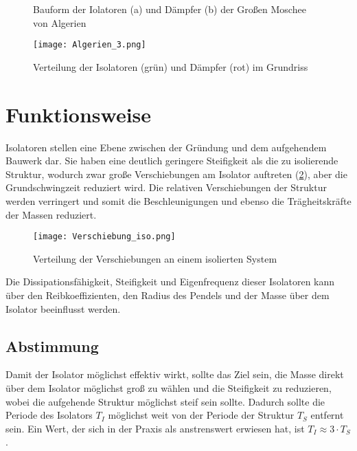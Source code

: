 \begin{figure}[H]
    \centering
    \qquad
    \caption{Bauform der Iolatoren (a) und Dämpfer (b) der Großen Moschee von Algerien \cite{AKK}}%
\end{figure}

\begin{figure}[H]
    \centering
    \texttt{[image: Algerien\_3.png]}
    \caption{Verteilung der Isolatoren (grün) und Dämpfer (rot) im Grundriss \cite{AKK}}
	\label{Dampener}
\end{figure}

\pagebreak

\section{Funktionsweise}
\label{sec:funktion}

Isolatoren stellen eine Ebene zwischen der Gründung und dem aufgehendem Bauwerk dar. Sie haben eine deutlich geringere Steifigkeit als die zu isolierende Struktur, wodurch zwar große Verschiebungen am Isolator auftreten (\cref{Verteilung}), aber die Grundschwingzeit reduziert wird.
Die relativen Verschiebungen der Struktur werden verringert und somit die Beschleunigungen und ebenso die Trägheitskräfte der Massen reduziert.

\begin{figure}[h]
    \centering
    \texttt{[image: Verschiebung\_iso.png]}
    \caption{Verteilung der Verschiebungen an einem isolierten System \cite{Kelly}}
	\label{Verteilung}
\end{figure}

Die Dissipationsfähigkeit, Steifigkeit und Eigenfrequenz dieser Isolatoren kann über den Reibkoeffizienten, den Radius des Pendels und der Masse über dem Isolator beeinflusst werden.

\subsection{Abstimmung}
\label{sec:abstimmung}

Damit der Isolator möglichst effektiv wirkt, sollte das Ziel sein, die Masse direkt über dem Isolator möglichst groß zu wählen und die Steifigkeit zu reduzieren, wobei die aufgehende Struktur möglichst steif sein sollte.
Dadurch sollte die Periode des Isolators $T_I$ möglichst weit von der Periode der Struktur $T_S$ entfernt sein.
Ein Wert, der sich in der Praxis als anstrenswert erwiesen hat, ist $T_I \approx 3 \cdot T_S$.

